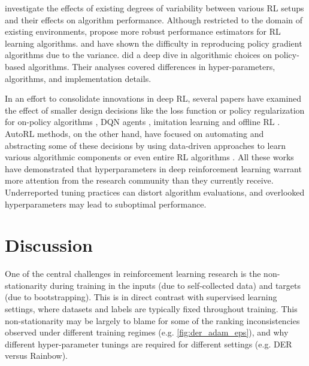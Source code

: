 \documentclass[10pt]{article} %
\begin{document}
\cite{Henderson2017DeepRL} investigate the effects of existing degrees of variability between various RL setups and their effects on algorithm performance. Although restricted to the domain of existing environments, \cite{Henderson2017DeepRL} propose more robust performance estimators for RL learning algorithms. \cite{islam2017reproducibility} and \cite{shengyi2022the37implementation} have shown the difficulty in reproducing policy gradient algorithms due to the variance.
\cite{andrychowicz2020matters} did a deep dive in algorithmic choices on policy-based algorithms. Their analyses covered differences in hyper-parameters, algorithms, and implementation details.


In an effort to consolidate innovations in deep RL, several papers have examined the effect of smaller design decisions like the loss function or policy regularization for on-policy algorithms \cite{andrychowicz2020matters}, DQN agents \citep{obando2020revisiting}, imitation learning \citep{hussenot2021hyperparameter} and offline RL \citep{paine2020hyperparameter, lu2021revisiting}. AutoRL methods, on the other hand, have focused on automating and abstracting some of these decisions \citep{parker2022automated, eimer2023hyperparameters} by using data-driven approaches to learn various algorithmic components or even entire RL algorithms \citep{co2021evolving,lu2022discovered}. All these works have demonstrated that hyperparameters in deep reinforcement learning warrant more attention from the research community than they currently receive. Underreported tuning practices can distort algorithm evaluations, and overlooked hyperparameters may lead to suboptimal performance.



\section{Discussion}
\label{sec:discussion}
One of the central challenges in reinforcement learning research is the non-stationarity during training in the inputs (due to self-collected data) and targets (due to bootstrapping). This is in direct contrast with supervised learning settings, where datasets and labels are typically fixed throughout training. This non-stationarity may be largely to blame for some of the ranking inconsistencies observed under different training regimes (e.g. \autoref{fig:der_adam_eps}), and why different hyper-parameter tunings are required for different settings (e.g. DER versus Rainbow).
\end{document}
